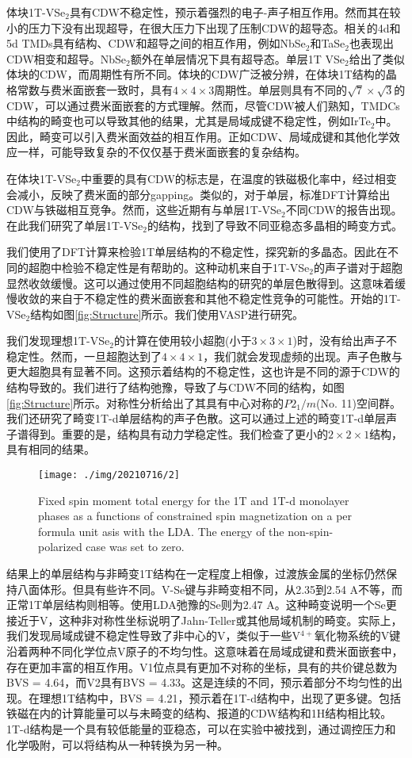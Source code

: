 \documentclass[reprint, aps, prb, showkeys]{revtex4-2}
\begin{document}
体块1T-VSe$_2$具有CDW不稳定性，预示着强烈的电子-声子相互作用。然而其在较小的压力下没有出现超导，在很大压力下出现了压制CDW的超导态。相关的4d和5d TMDs具有结构、CDW和超导之间的相互作用，例如NbSe$_2$和TaSe$_2$也表现出CDW相变和超导。NbSe$_2$额外在单层情况下具有超导态。单层1T VSe$_2$给出了类似体块的CDW，而周期性有所不同。体块的CDW广泛被分辨，在体块1T结构的晶格常数与费米面嵌套一致时，具有$4 \times 4 \times 3$周期性。单层则具有不同的$\sqrt{7} \times \sqrt{3}$的CDW，可以通过费米面嵌套的方式理解。然而，尽管CDW被人们熟知，TMDCs中结构的畸变也可以导致其他的结果，尤其是局域成键不稳定性，例如IrTe$_2$中。因此，畸变可以引入费米面效益的相互作用。正如CDW、局域成键和其他化学效应一样，可能导致复杂的不仅仅基于费米面嵌套的复杂结构。

在体块1T-VSe$_2$中重要的具有CDW的标志是，在温度的铁磁极化率中，经过相变会减小，反映了费米面的部分gapping。类似的，对于单层，标准DFT计算给出CDW与铁磁相互竞争。然而，这些近期有与单层1T-VSe$_2$不同CDW的报告出现。在此我们研究了单层1T-VSe$_2$的结构，找到了导致不同亚稳态多晶相的畸变方式。

我们使用了DFT计算来检验1T单层结构的不稳定性，探究新的多晶态。因此在不同的超胞中检验不稳定性是有帮助的。这种动机来自于1T-VSe$_2$的声子谱对于超胞显然收敛缓慢。这可以通过使用不同超胞结构的研究的单层色散得到。这意味着缓慢收敛的来自于不稳定性的费米面嵌套和其他不稳定性竞争的可能性。开始的1T-VSe$_2$结构如图\ref{fig:Structure}所示。我们使用VASP进行研究。

我们发现理想1T-VSe$_2$的计算在使用较小超胞(小于$3 \times 3\times 1$)时，没有给出声子不稳定性。然而，一旦超胞达到了$4 \times 4 \times 1$，我们就会发现虚频的出现。声子色散与更大超胞具有显著不同。这预示着结构的不稳定性，这也许是不同的源于CDW的结构导致的。我们进行了结构弛豫，导致了与CDW不同的结构，如图\ref{fig:Structure}所示。对称性分析给出了其具有中心对称的$P2_1/m$(No. 11)空间群。我们还研究了畸变1T-d单层结构的声子色散。这可以通过上述的畸变1T-d单层声子谱得到。重要的是，结构具有动力学稳定性。我们检查了更小的$2 \times 2 \times 1$结构，具有相同的结果。

\begin{figure}[t]
    \texttt{[image: ./img/20210716/2]}
    \caption{\label{fig:Magmom} 
    Fixed spin moment total energy for the 1T and 1T-d monolayer phases as a functions of constrained spin magnetization on a per formula unit asis with the LDA. The energy of the non-spin-polarized case was set to zero.
    }
\end{figure}

结果上的单层结构与非畸变1T结构在一定程度上相像，过渡族金属的坐标仍然保持八面体形。但具有些许不同。V-Se键与非畸变相不同，从2.35到2.54 A不等，而正常1T单层结构则相等。使用LDA弛豫的Se则为2.47 A。这种畸变说明一个Se更接近于V，这种非对称性坐标说明了Jahn-Teller或其他局域机制的畸变。实际上，我们发现局域成键不稳定性导致了非中心的V，类似于一些V$^{4+}$氧化物系统的V键沿着两种不同化学位点V原子的不均匀性。这意味着在局域成键和费米面嵌套中，存在更加丰富的相互作用。V1位点具有更加不对称的坐标，具有的共价键总数为BVS = 4.64，而V2具有BVS = 4.33。这是连续的不同，预示着部分不均匀性的出现。在理想1T结构中，BVS = 4.21，预示着在1T-d结构中，出现了更多键。包括铁磁在内的计算能量可以与未畸变的结构、报道的CDW结构和1H结构相比较。1T-d结构是一个具有较低能量的亚稳态，可以在实验中被找到，通过调控压力和化学吸附，可以将结构从一种转换为另一种。
\end{document}
